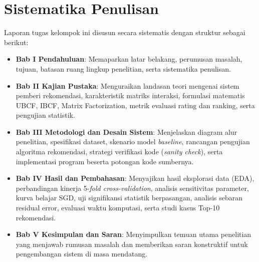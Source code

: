 \section{Sistematika Penulisan}
Laporan tugas kelompok ini disusun secara sistematis dengan struktur sebagai berikut:
\begin{itemize}
    \item \textbf{Bab I Pendahuluan}: Memaparkan latar belakang, perumusan masalah, tujuan, batasan ruang lingkup penelitian, serta sistematika penulisan.
    \item \textbf{Bab II Kajian Pustaka}: Menguraikan landasan teori mengenai sistem pemberi rekomendasi, karakteristik matriks interaksi, formulasi matematis UBCF, IBCF, Matrix Factorization, metrik evaluasi rating dan ranking, serta pengujian statistik.
    \item \textbf{Bab III Metodologi dan Desain Sistem}: Menjelaskan diagram alur penelitian, spesifikasi dataset, skenario model \textit{baseline}, rancangan pengujian algoritma rekomendasi, strategi verifikasi kode (\textit{sanity check}), serta implementasi program beserta potongan kode sumbernya.
    \item \textbf{Bab IV Hasil dan Pembahasan}: Menyajikan hasil eksplorasi data (EDA), perbandingan kinerja 5-\textit{fold cross-validation}, analisis sensitivitas parameter, kurva belajar SGD, uji signifikansi statistik berpasangan, analisis sebaran residual error, evaluasi waktu komputasi, serta studi kasus Top-10 rekomendasi.
    \item \textbf{Bab V Kesimpulan dan Saran}: Menyimpulkan temuan utama penelitian yang menjawab rumusan masalah dan memberikan saran konstruktif untuk pengembangan sistem di masa mendatang.
\end{itemize}

